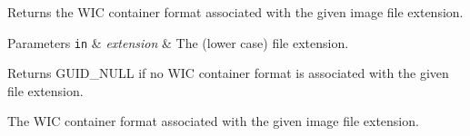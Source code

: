 Returns the W\+IC container format associated with the given image file extension.


\begin{DoxyParams}[1]{Parameters}
\mbox{\tt in}  & {\em extension} & The (lower case) file extension. \\
\hline
\end{DoxyParams}
\begin{DoxyReturn}{Returns}
{\ttfamily G\+U\+I\+D\+\_\+\+N\+U\+LL} if no W\+IC container format is associated with the given file extension. 

The W\+IC container format associated with the given image file extension. 
\end{DoxyReturn}
